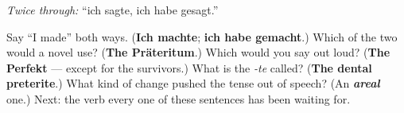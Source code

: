 \emph{Twice through:} \textquotedblleft{}ich sagte, ich habe gesagt.\textquotedblright{}

\begin{tcolorbox}[breakable,colback=teal!4,colframe=teal!35!black,title={Before you move on}]
Say \textquotedblleft{}I made\textquotedblright{} both ways. (\textbf{Ich machte}; \textbf{ich habe gemacht}.) Which of the two would a novel use? (\textbf{The Präteritum}.) Which would you say out loud? (\textbf{The Perfekt} — except for the survivors.) What is the \emph{-te} called? (\textbf{The dental preterite}.) What kind of change pushed the tense out of speech? (An \emph{\textbf{areal}} one.) Next: the verb every one of these sentences has been waiting for.
\end{tcolorbox}
